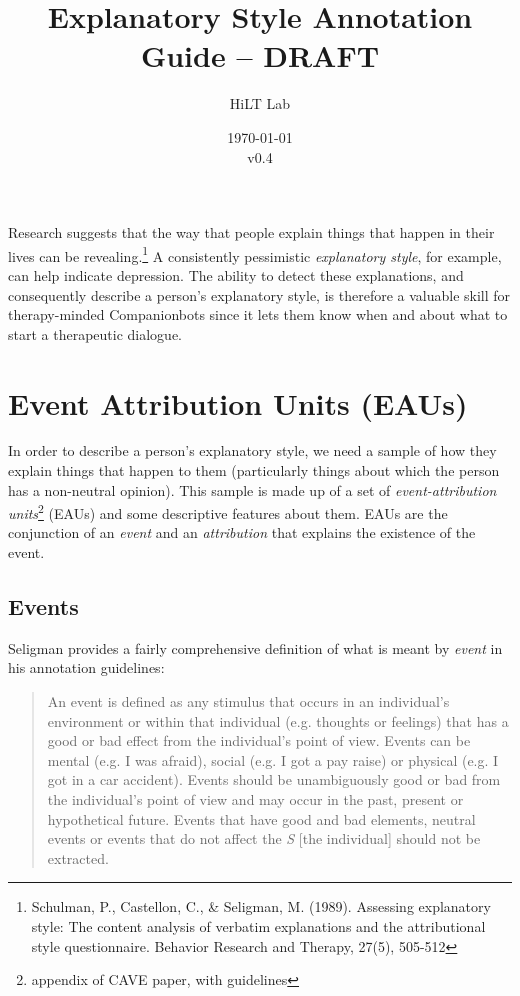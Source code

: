 \documentclass[a4paper,12pt]{article}
\begin{document}
\title{Explanatory Style Annotation Guide -- DRAFT}
\author{HiLT Lab}
\date{\today\\v0.4}
\maketitle

\tableofcontents
\break

Research suggests that the way that people explain things that happen in their lives can be revealing.\footnote{\label{seligman89}Schulman, P., Castellon, C., \& Seligman, M. (1989). Assessing explanatory style: The content analysis of verbatim explanations and the attributional style questionnaire. Behavior Research and Therapy, 27(5), 505-512} %
A consistently pessimistic \emph{explanatory style}, for example, can help indicate depression.
The ability to detect these explanations, and consequently describe a person's explanatory style, is therefore a valuable skill for therapy-minded Companionbots since it lets them know when and about what to start a therapeutic dialogue.

\section{Event Attribution Units (EAUs)}
In order to describe a person's explanatory style, we need a sample of how they explain things that happen to them (particularly things about which the person has a non-neutral opinion). %
This sample is made up of a set of \emph{event-attribution units}\footnote{\label{CAVE}appendix of CAVE paper, with guidelines} (EAUs) and some descriptive features about them. %
EAUs are the conjunction of an \emph{event} and an \emph{attribution} that explains the existence of the event.
 

\subsection{Events}

Seligman provides a fairly comprehensive definition of what is meant by \emph{event} in his annotation guidelines: %

\begin{quote}
    An event is defined as any stimulus that occurs in an individual's environment or within that individual (e.g. thoughts or feelings) that has a good or bad effect from the individual's point of view.
    Events can be mental (e.g. I was afraid), social (e.g. I got a pay raise) or physical (e.g. I got in a car accident).
    Events should be unambiguously good or bad from the individual's point of view and may occur in the past, present or hypothetical future.
    Events that have good and bad elements, neutral events or events that do not affect the \emph{S} [the individual] should not be extracted.
\end{quote}
\end{document}
